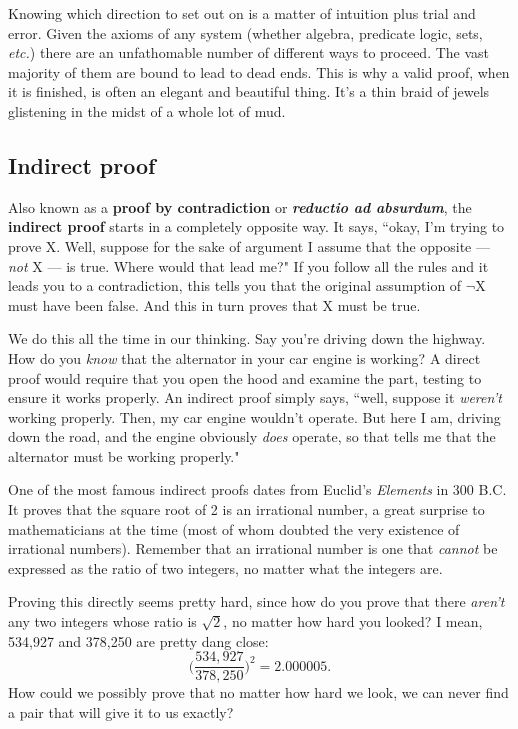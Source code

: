 Knowing which direction to set out on is a matter of intuition plus trial
and error. Given the axioms of any system (whether algebra, predicate
logic, sets, \textit{etc.}) there are an unfathomable number of different
ways to proceed. The vast majority of them are bound to lead to dead ends.
This is why a valid proof, when it is finished, is often an elegant and
beautiful thing. It's a thin braid of jewels glistening in the midst of a
whole lot of mud.

\subsection{Indirect proof}

Also known as a \textbf{proof by contradiction} or \textbf{\textit{reductio
ad absurdum}}, the \textbf{indirect proof} starts in a completely opposite
way. It says, ``okay, I'm trying to prove X. Well, suppose for the sake of
argument I assume that the opposite --- \textit{not} X --- is true. Where
would that lead me?" If you follow all the rules and it leads you to a
contradiction, this tells you that the original assumption of $\neg$X must
have been false. And this in turn proves that X must be true.

We do this all the time in our thinking. Say you're driving down the
highway. How do you \textit{know} that the alternator in your car engine is
working? A direct proof would require that you open the hood and examine
the part, testing to ensure it works properly. An indirect proof simply
says, ``well, suppose it \textit{weren't} working properly. Then, my car
engine wouldn't operate. But here I am, driving down the road, and the
engine obviously \textit{does} operate, so that tells me that the
alternator must be working properly."

One of the most famous indirect proofs dates from Euclid's
\textit{Elements} in 300 B.C. It proves that the square root of 2 is an
irrational number, a great surprise to mathematicians at the time (most of
whom doubted the very existence of irrational numbers). Remember that an
irrational number is one that \textit{cannot} be expressed as the ratio of
two integers, no matter what the integers are.

Proving this directly seems pretty hard, since how do you prove that there
\textit{aren't} any two integers whose ratio is $\sqrt{2}$, no matter how
hard you looked? I mean, 534,927 and 378,250 are pretty dang close:
\[
\Bigg(\frac{534,927}{378,250}\Bigg)^2 = 2.000005.
\]
How could we possibly prove that no matter how hard we look, we can never
find a pair that will give it to us exactly?

